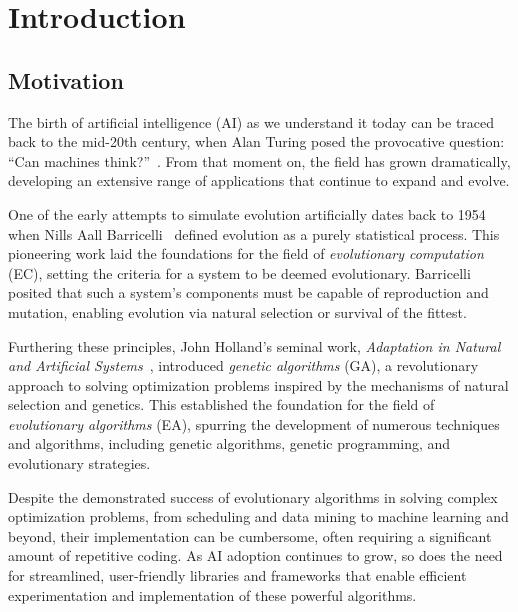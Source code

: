 \chapter{Introduction}
\label{chap:introduction}
  \section{Motivation}
  \label{sec:motivation}
    The birth of artificial intelligence (AI) as we understand it today can be
    traced back to the mid-20th century, when Alan Turing posed the provocative
    question: \enquote{Can machines
    think?}~\autocite{turingCOMPUTINGMACHINERYINTELLIGENCE1950a}.
    From that moment on, the field has grown dramatically, developing an
    extensive range of applications that continue to expand and evolve.

    One of the early attempts to simulate evolution artificially dates back to
    1954 when Nills Aall
    Barricelli~\autocite{barricelliNumericalTestingEvolution1962} defined
    evolution as a purely statistical process.
    This pioneering work laid the foundations for the field of
    \emph{evolutionary computation} (EC), setting the criteria for a system to
    be deemed evolutionary.
    Barricelli posited that such a system's components must be capable of
    reproduction and mutation, enabling evolution via natural selection or
    survival of the fittest.

    Furthering these principles, John Holland's seminal work, \emph{Adaptation
    in Natural and Artificial
    Systems}~\autocite{hollandAdaptationNaturalArtificial1992a}, introduced
    \emph{genetic algorithms} (GA), a revolutionary approach to solving
    optimization problems inspired by the mechanisms of natural selection and
    genetics.
    This established the foundation for the field of \emph{evolutionary
    algorithms} (EA), spurring the development of numerous techniques and
    algorithms, including genetic algorithms, genetic programming, and
    evolutionary strategies.

    Despite the demonstrated success of evolutionary algorithms in solving
    complex optimization problems, from scheduling and data mining to machine
    learning and beyond, their implementation can be cumbersome, often requiring
    a significant amount of repetitive coding.
    As AI adoption continues to grow, so does the need for streamlined,
    user-friendly libraries and frameworks that enable efficient experimentation
    and implementation of these powerful algorithms.

